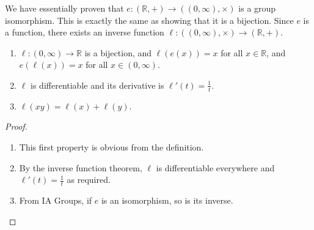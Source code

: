 \begin{remark}
	We have essentially proven that \(e \colon (\mathbb R, +) \to ((0, \infty), \times)\) is a group isomorphism.
	This is exactly the same as showing that it is a bijection.
	Since \(e\) is a function, there exists an inverse function \(\ell \colon ((0, \infty), \times) \to (\mathbb R, +)\).
\end{remark}
\begin{theorem}
	\begin{enumerate}
		\item \(\ell \colon (0, \infty) \to \mathbb R\) is a bijection, and \(\ell(e(x)) = x\) for all \(x \in \mathbb R\), and \(e(\ell(x)) = x\) for all \(x \in (0, \infty)\).
		\item \(\ell\) is differentiable and its derivative is \(\ell'(t) = \frac{1}{t}\).
		\item \(\ell(xy) = \ell(x) + \ell(y)\).
	\end{enumerate}
\end{theorem}
\begin{proof}
	\begin{enumerate}
		\item This first property is obvious from the definition.
		\item By the inverse function theorem, \(\ell\) is differentiable everywhere and \(\ell'(t) = \frac{1}{t}\) as required.
		\item From IA Groups, if \(e\) is an isomorphism, so is its inverse.
	\end{enumerate}
\end{proof}


